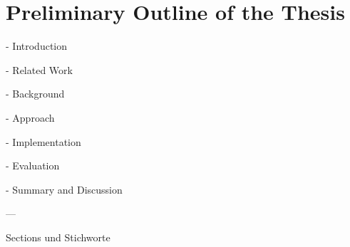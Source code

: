 \chapter{Preliminary Outline of the Thesis}
\label{ch:outline}

- Introduction

- Related Work

- Background 

- Approach

- Implementation

- Evaluation

- Summary and Discussion


---

Sections und Stichworte